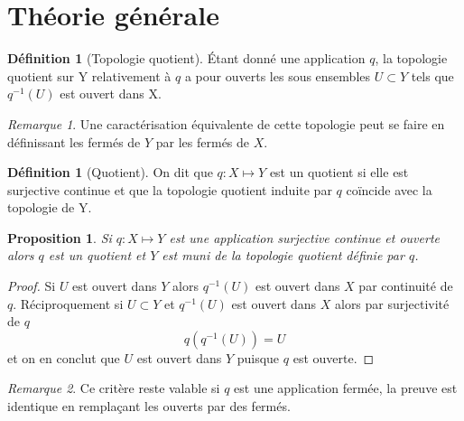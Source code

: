 \documentclass[12pt]{book}
\newtheorem{prop}[lemma]{Proposition}
\theoremstyle{definition}
\newtheorem{definition}[lemma]{Définition}
\theoremstyle{remark}
\newtheorem*{remark}{Remarque}
\begin{document}
	\section{Théorie générale}
	\begin{definition}[Topologie quotient]
		Étant donné une application $q$, la topologie quotient sur Y relativement à $q$ a pour ouverts les sous ensembles $U \subset Y$ tels que $q^{-1}(U)$ est ouvert dans X.
	\end{definition}
	\begin{remark}
		Une caractérisation équivalente de cette topologie peut se faire en définissant les fermés de $Y$ par les fermés de $X$.
	\end{remark}
	\begin{definition}[Quotient]
		On dit que $q : X \longmapsto Y$ est un quotient si elle est surjective continue et que la topologie quotient induite par $q$ coïncide avec la topologie de Y.	
	\end{definition}
	\begin{prop}
		Si $q : X \longmapsto Y$ est une application surjective continue et ouverte alors $q$ est un quotient et $Y$ est muni de la topologie quotient définie par $q$.
	\end{prop}
	\begin{proof}
		Si $U$ est ouvert dans $Y$ alors $q^{-1}(U)$ est ouvert dans $X$ par continuité de $q$. Réciproquement si  $ U \subset Y$ et $q^{-1}(U)$ est ouvert dans $X$ alors par surjectivité de $q$  \[
			q(q^{-1}(U)) = U
		\] et on en conclut que $U$ est ouvert dans $Y$ puisque $q$ est ouverte. 
	\end{proof}
	\begin{remark}
		Ce critère reste valable si $q$ est une application fermée, la preuve est identique en remplaçant les ouverts par des fermés.
	\end{remark}
\end{document}

